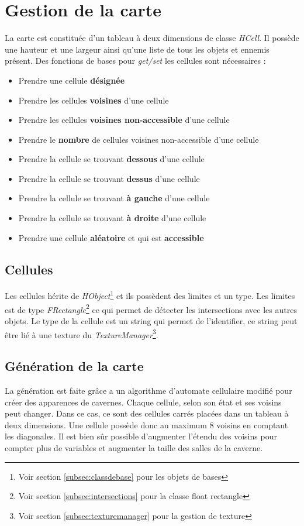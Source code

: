 \documentclass[11pt, a4paper, oneside]{report}
\begin{document}
\section{Gestion de la carte}
La carte est constituée d'un tableau à deux dimensions de classe \emph{HCell}. Il possède une hauteur et une largeur ainsi qu'une liste de tous les objets et ennemis présent. Des fonctions de bases pour \emph{get/set} les cellules sont nécessaires :
\begin{itemize}
	\item Prendre une cellule \textbf{désignée}
	\item Prendre les cellules \textbf{voisines} d'une cellule
	\item Prendre les cellules \textbf{voisines non-accessible} d'une cellule
	\item Prendre le \textbf{nombre} de cellules voisines non-accessible d'une cellule
	\item Prendre la cellule se trouvant \textbf{dessous} d'une cellule
	\item Prendre la cellule se trouvant \textbf{dessus} d'une cellule
	\item Prendre la cellule se trouvant \textbf{à gauche} d'une cellule
	\item Prendre la cellule se trouvant \textbf{à droite} d'une cellule
	\item Prendre une cellule \textbf{aléatoire} et qui est \textbf{accessible}
\end{itemize}
\subsection{Cellules}
Les cellules hérite de \textit{HObject}\footnote{Voir section \ref{subsec:classdebase} pour les objets de bases} et ils possèdent des limites et un type. Les limites est de type \textit{FRectangle}\footnote{Voir section \ref{subsec:intersections} pour la classe float rectangle} ce qui permet de détecter les intersections avec les autres objets. Le type de la cellule est un string qui permet de l'identifier, ce string peut être lié à une texture du \textit{TextureManager}\footnote{Voir section \ref{subsec:texturemanager} pour la gestion de texture}.
\subsection{Génération de la carte}
La génération est faite grâce a un algorithme d'automate cellulaire modifié pour créer des apparences de cavernes. Chaque cellule, selon son état et ses voisins peut changer. Dans ce cas, ce sont des cellules carrés placées dans un tableau à deux dimensions. Une cellule possède donc au maximum 8 voisins en comptant les diagonales. Il est bien sûr possible d'augmenter l'étendu des voisins pour compter plus de variables et augmenter la taille des salles de la caverne.
\end{document}
